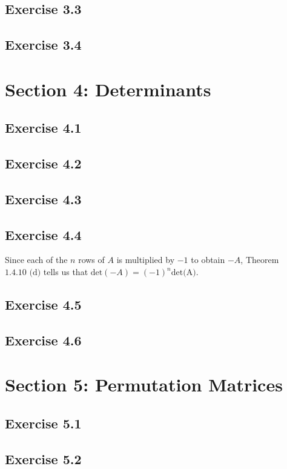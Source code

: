 \documentclass{article}
\begin{document}
\subsection*{Exercise 3.3}
\subsection*{Exercise 3.4}

\section*{Section 4: Determinants}

\subsection*{Exercise 4.1}
\subsection*{Exercise 4.2}
\subsection*{Exercise 4.3}
\subsection*{Exercise 4.4}

Since each of the $n$ rows of $A$ is multiplied by $-1$ to obtain $-A$, Theorem $1.4.10\text{ (d)}$ tells us that $\text{det}(-A)=(-1)^n\text{det(A)}$.

\subsection*{Exercise 4.5}
\subsection*{Exercise 4.6}

\section*{Section 5: Permutation Matrices}

\subsection*{Exercise 5.1}
\subsection*{Exercise 5.2}
\end{document}
